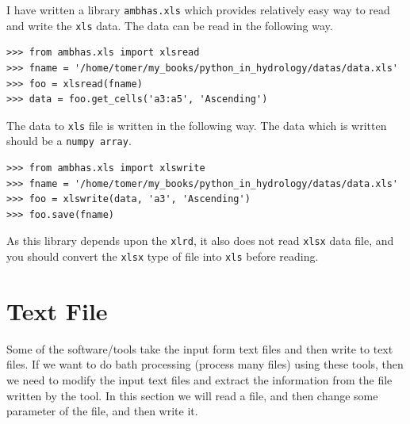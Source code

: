 \documentclass[10pt]{book}
\begin{document}
I have written a library \verb"ambhas.xls" which provides relatively easy way to read and write the \verb"xls" data. The data can be read in the following way. 
\beforeverb \begin{verbatim}
>>> from ambhas.xls import xlsread
>>> fname = '/home/tomer/my_books/python_in_hydrology/datas/data.xls'
>>> foo = xlsread(fname)
>>> data = foo.get_cells('a3:a5', 'Ascending')
\end{verbatim} \afterverb

The data to \verb"xls" file is written in the following way. The data which is written should be a \verb"numpy array".
\beforeverb \begin{verbatim}
>>> from ambhas.xls import xlswrite
>>> fname = '/home/tomer/my_books/python_in_hydrology/datas/data.xls'
>>> foo = xlswrite(data, 'a3', 'Ascending')
>>> foo.save(fname)
\end{verbatim} \afterverb
As this library depends upon the \verb"xlrd", it also does not read \verb"xlsx" data file, and you should convert the \verb"xlsx" type of file into \verb"xls" before reading.

\section{Text File}
Some of the software/tools take the input form text files and then write to text files. If we want to do bath processing (process many files) using these tools, then we need to modify the input text files and extract the information from the file written by the tool. In this section we will read a file, and then change some parameter of the file, and then write it.\\
\end{document}
